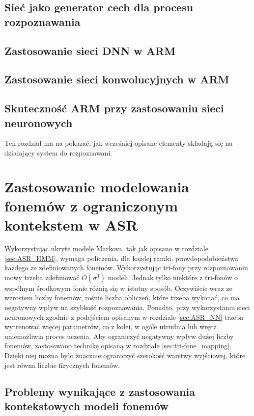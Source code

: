 \documentclass[11pt]{article}
\begin{document}
	\subsection{Sieć jako generator cech dla procesu rozpoznawania }
	\subsection{Zastosowanie sieci DNN w ARM}
	\subsection{Zastosowanie sieci konwolucyjnych w ARM}
	\subsection{Skuteczność ARM przy zastosowaniu sieci neuronowych}
	
	Ten rozdział ma na pokazać, jak wcześniej opisane elementy składają się na działający system do rozpoznawani.

\section{ Zastosowanie modelowania fonemów z ograniczonym kontekstem w ASR }	
	Wykorzystując ukryte modele Markova, tak jak opisano w rozdziale \ref{sec:ASR_HMM}, wymaga policzenia, dla każdej ramki, prawdopodobieństwa każdego ze zdefiniowanych fonemów. Wykorzystując tri-fony przy rozpoznawaniu mowy trzeba zdefiniować $O(\sigma^3)$ modeli. Jednak tylko niektóre z tri-fonów o wspólnym środkowym fonie różnią się w istotny sposób. Oczywiście wraz ze wzrostem liczby fonemów, rośnie liczba obliczeń, które trzeba wykonać, co ma negatywny wpływ na szybkość rozpoznawania. Ponadto, przy wykorzystaniu sieci neuronowych zgodnie z podejściem opisanym w rozdziale \ref{sec:ASR_NN} trzeba wytrenować więcej parametrów, co z kolei, w ogóle utrudnia lub wręcz uniemożliwia proces uczenia. Aby ograniczyć negatywny wpływ dużej liczby fonemów, zastosowano technikę opisaną w rozdziale \ref{sec:tri-fone_mapping}. Dzięki niej można było znacznie ograniczyć szerokość warstwy wyjściowej, które jest równa liczbie fizycznych fonemów.
	
	\subsection{ Problemy wynikające z zastosowania kontekstowych modeli fonemów }
\end{document}
